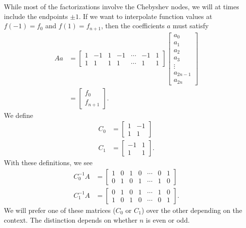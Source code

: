 While most of the factorizations involve the Chebyshev nodes, we will
at times include the endpoints $\pm1$. If we want to interpolate
function values at $f(-1) = f_{0}$ and $f(1) = f_{n+1}$, then the
coefficients $a$ must satisfy
%
\begin{align}
    Aa &= \begin{bmatrix} 1 & -1 & 1 & -1 & \cdots & -1 & 1 \\
            1 & 1 & 1 & 1 & \cdots & 1 & 1 \end{bmatrix}
            \begin{bmatrix} a_{0} \\ a_{1} \\ a_{2} \\ a_{3} \\ \vdots \\
                a_{2n-1} \\ a_{2n} \end{bmatrix} \nonumber\\
        &= \begin{bmatrix} f_{0} \\ f_{n+1} \end{bmatrix}.
        \label{eq:vand_pm1}
\end{align}
%
We define
%
\begin{align}
    C_{0} &= \begin{bmatrix} 1 & -1 \\ 1 & 1 \end{bmatrix} \nonumber\\
    C_{1} &= \begin{bmatrix} -1 & 1 \\ 1 & 1 \end{bmatrix}.
    \label{eq:vand_pm1_C}
\end{align}
%
With these definitions, we see
%
\begin{align}
    C_{0}^{-1}A &= \begin{bmatrix} 1 & 0 & 1 & 0 & \cdots & 0 & 1 \\
            0 & 1 & 0 & 1 & \cdots & 1 & 0 \end{bmatrix} \nonumber\\
    C_{1}^{-1}A &= \begin{bmatrix} 0 & 1 & 0 & 1 & \cdots & 1 & 0 \\
            1 & 0 & 1 & 0 & \cdots & 0 & 1 \end{bmatrix}.
\end{align}
%
We will prefer one of these matrices ($C_{0}$ or $C_{1}$) over the
other depending on the context. The distinction depends on whether
$n$ is even or odd.



